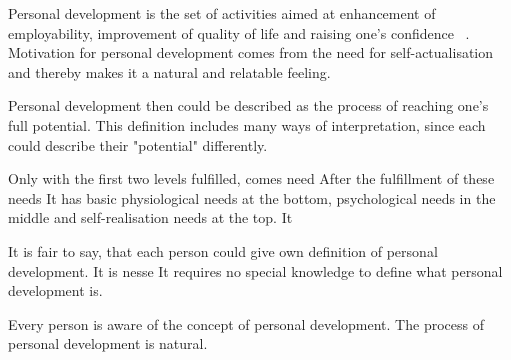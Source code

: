 Personal development is the set of activities aimed at enhancement of employability, improvement of quality of life and raising one's confidence ~\cite{what-is-personal-development}.
Motivation for personal development comes from the need for self-actualisation and thereby makes it a natural and relatable feeling.





Personal development then could be described as the process of reaching one's full potential.
This definition includes many ways of interpretation, since each could describe their "potential" differently.



Only with the first two levels fulfilled, comes need
After the fulfillment of these needs
It has basic physiological needs at the bottom, psychological needs in the middle and self-realisation needs at the top.
It


It is fair to say, that each person could give own definition of personal development.
It is nesse
It requires no special knowledge to define what personal development is.

Every person is aware of the concept of personal development.
The process of personal development is natural.
